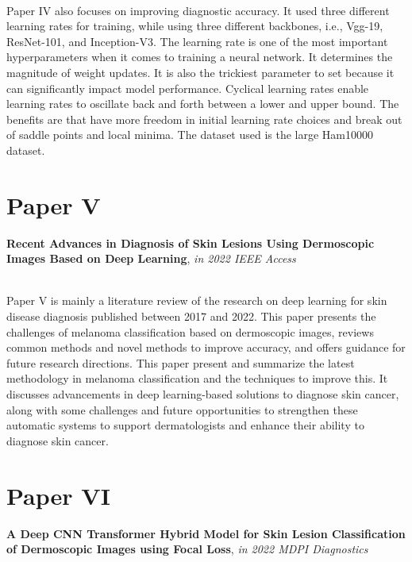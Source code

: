 ~\\

Paper IV also focuses on improving diagnostic accuracy. It used three different learning rates for training, while using three different backbones, i.e., Vgg-19, ResNet-101, and Inception-V3. The learning rate is one of the most important hyperparameters when it comes to training a neural network. It determines the magnitude of weight updates. It is also the trickiest parameter to set because it can significantly impact model performance. Cyclical learning rates enable learning rates to oscillate back and forth between a lower and upper bound. The benefits are that have more freedom in initial learning rate choices and break out of saddle points and local minima. The dataset used is the large Ham10000 dataset.

\section*{Paper V}
\textbf{Recent Advances in Diagnosis of Skin Lesions Using Dermoscopic Images Based on Deep Learning}, \textit{in 2022 IEEE Access}



~\\

Paper V  is mainly a literature review of the research on deep learning for skin disease diagnosis published between 2017 and 2022. This paper presents the challenges of melanoma classification based on dermoscopic images, reviews common methods and novel methods to improve accuracy, and offers guidance for future research directions. This paper present and summarize the latest methodology in melanoma classification and the techniques to improve this. It discusses advancements in deep learning-based solutions to diagnose skin cancer, along with some challenges and future opportunities to strengthen these automatic systems to support dermatologists and enhance their ability to diagnose skin cancer.

\section*{Paper VI}
\textbf{A Deep CNN Transformer Hybrid Model for Skin Lesion Classification of Dermoscopic Images using Focal Loss}, \textit{in 2022 MDPI Diagnostics}



~\\


